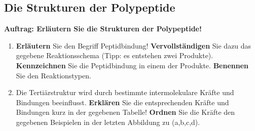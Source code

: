 \documentclass{scrartcl}  %
\begin{document}
\newpage

		\subsection{Die Strukturen der Polypeptide}
			
			\textbf{Auftrag: Erläutern Sie die Strukturen der Polypeptide!}
			\begin{enumerate}
				\item \textbf{Erläutern} Sie den Begriff Peptidbindung! \textbf{Vervollständigen} Sie dazu das gegebene Reaktionsschema (Tipp: es entstehen zwei Produkte). \textbf{Kennzeichnen} Sie die Peptidbindung in einem der Produkte. \textbf{Benennen} Sie den Reaktionstypen.
				\item Die Tertiärstruktur wird durch bestimmte intermolekulare Kräfte und Bindungen beeinflusst. \textbf{Erklären} Sie die entsprechenden Kräfte und Bindungen kurz in der gegebenen Tabelle! \textbf{Ordnen} Sie die Kräfte den gegebenen Beispielen in der letzten Abbildung zu (a,b,c,d).
			\end{enumerate}
			
\end{document}
